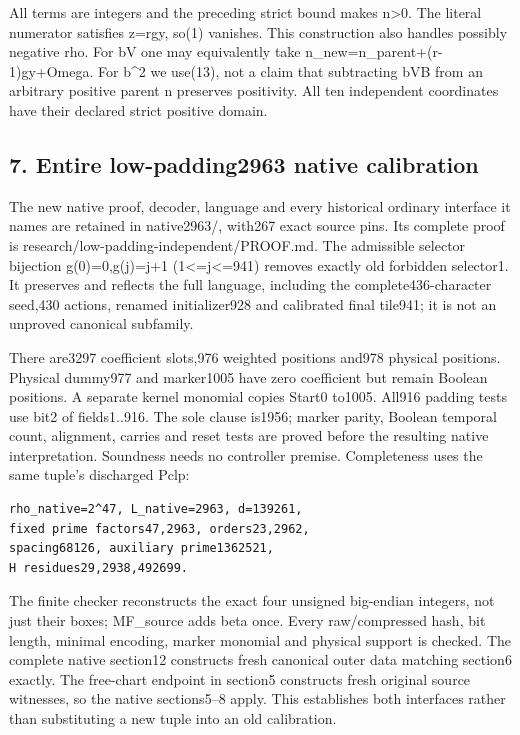 All terms are integers and the preceding strict bound makes
n\textgreater0. The literal numerator satisfies z=rgy, so(1) vanishes.
This construction also handles possibly negative rho. For bV one may
equivalently take n\_new=n\_parent+(r-1)gy+Omega. For b\^{}2 we use(13),
not a claim that subtracting bVB from an arbitrary positive parent n
preserves positivity. All ten independent coordinates have their
declared strict positive domain.

\subsection{7. Entire low-padding2963 native
calibration}\label{entire-low-padding2963-native-calibration}

The new native proof, decoder, language and every historical ordinary
interface it names are retained in native2963/, with267 exact source
pins. Its complete proof is research/low-padding-independent/PROOF.md.
The admissible selector bijection g(0)=0,g(j)=j+1
(1\textless=j\textless=941) removes exactly old forbidden selector1. It
preserves and reflects the full language, including the
complete436-character seed,430 actions, renamed initializer928 and
calibrated final tile941; it is not an unproved canonical subfamily.

There are3297 coefficient slots,976 weighted positions and978 physical
positions. Physical dummy977 and marker1005 have zero coefficient but
remain Boolean positions. A separate kernel monomial copies Start0
to1005. All916 padding tests use bit2 of fields1..916. The sole clause
is1956; marker parity, Boolean temporal count, alignment, carries and
reset tests are proved before the resulting native interpretation.
Soundness needs no controller premise. Completeness uses the same
tuple's discharged Pclp:

\begin{verbatim}
rho_native=2^47, L_native=2963, d=139261,
fixed prime factors47,2963, orders23,2962,
spacing68126, auxiliary prime1362521,
H residues29,2938,492699.
\end{verbatim}

The finite checker reconstructs the exact four unsigned big-endian
integers, not just their boxes; MF\_source adds beta once. Every
raw/compressed hash, bit length, minimal encoding, marker monomial and
physical support is checked. The complete native section12 constructs
fresh canonical outer data matching section6 exactly. The free-chart
endpoint in section5 constructs fresh original source witnesses, so the
native sections5--8 apply. This establishes both interfaces rather than
substituting a new tuple into an old calibration.

